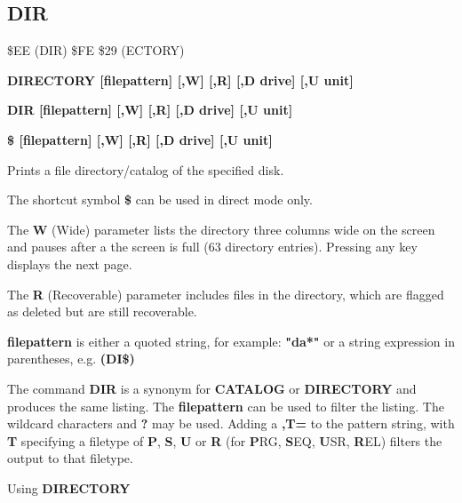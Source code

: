 
\newpage
\subsection{DIR}
\begin{description}[leftmargin=2cm,style=nextline]
\item [Token:] \$EE (DIR) \$FE \$29 (ECTORY)
\item [Format:] {\bf DIRECTORY [filepattern] [,W] [,R] [,D drive] [,U unit] }
\item [Format:] {\bf DIR [filepattern] [,W] [,R] [,D drive] [,U unit] }
\item [Format:] {\bf \$ [filepattern] [,W] [,R] [,D drive] [,U unit] }
\item [Usage:]  Prints a file directory/catalog of the specified disk.

   The shortcut symbol {\bf \$} can be used in direct mode only.

   The {\bf W} (Wide) parameter lists the directory three columns wide
   on the screen and pauses after a the screen is full (63 directory
   entries). Pressing any key displays the next page.

   The {\bf R} (Recoverable) parameter includes files in the
   directory, which are flagged as deleted but are still
   recoverable.

   {\bf filepattern} is either a quoted string, for example: {\bf "da*"} or
   a string expression in parentheses, e.g. {\bf (DI\$)}

   \drivedefinition

   \unitdefinition

\item [Remarks:]
   The command {\bf DIR} is a synonym for {\bf CATALOG}
   or {\bf DIRECTORY} and produces the same listing.
   The {\bf filepattern} can be used to filter the listing.
   The wildcard characters {\bf *} and {\bf ?} may be used.
   Adding a {\bf ,T=} to the pattern string, with {\bf T} specifying
   a filetype of {\bf P}, {\bf S}, {\bf U} or {\bf R}
   (for {\bf P}RG, {\bf S}EQ, {\bf U}SR, {\bf R}EL) filters the
   output to that filetype.

\item [Example:] Using {\bf DIRECTORY}


%
%
%
%
%


\end{description}
